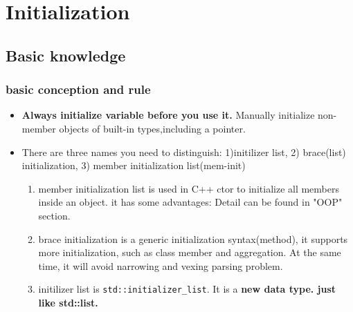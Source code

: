 \documentclass[a4paper,11pt,twoside]{book}
\begin{document}
\chapter{Initialization}
\section{Basic knowledge}

\subsection{basic conception and rule}
\begin{itemize}
	\item \textbf{Always initialize variable before you use it.} Manually initialize non-member objects of built-in types,including a pointer.
	
	\item There are three names you need to distinguish: 1)initilizer list, 2) brace(list) initialization, 3) member initialization list(mem-init)
	\begin{enumerate}
		\item member initialization list is used in C++ ctor to initialize all members inside an object. it has some advantages: Detail can be found in "OOP" section. 
		
		\item brace initialization is a generic initialization syntax(method), it supports more initialization, such as class member and aggregation. At the same time, it will avoid narrowing and vexing parsing problem. 
		
		\item initilizer list is \texttt{std::initializer\_list}. It is a \textbf{new data type. just like std::list.}
	\end{enumerate}
\end{itemize}
\end{document}
